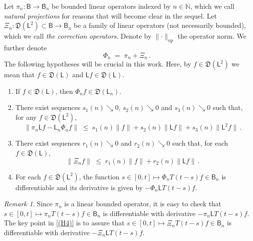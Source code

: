 \documentclass[12pt,a4paper]{article}
\theoremstyle{plain}
\theoremstyle{remark}
\newtheorem{remark}[theorem]{Remark}
\newcommand{\msf}[1]{{\mathsf #1}}
\newcommand{\mf}[1]{{\mathfrak #1}}
\newcommand{\bb}[1]{{\mathbb #1}}
\newcommand{\norm}[1]{\lVert#1\rVert}
\begin{document}
	Let $\pi_n : \msf{B} \to \msf{B}_n$ be bounded linear operators indexed by $n \in \bb{N}$, which we call \textit{natural projections} for reasons that will become clear in the sequel.
	Let  $\Xi_n : \mf{D}(\msf{L}^2)\subset \msf{B} \to \msf{B}_n$ be a family of linear operators (not necessarily bounded), which we call \textit{the correction operators}. Denote by $\norm{\cdot}_\text{op}$ the operator norm. We further denote
	\begin{equation}\label{eq:A}
		\Phi_n \;=\; \pi_n + \Xi_n\,.
	\end{equation}
	The following hypotheses will be crucial in this work. Here, by $f \in \mf{D}(\msf{L}^2)$ we mean that $f \in \mf{D}(\msf{L})$ and $\msf{L}f \in \mf{D}(\msf{L})$.
	\begin{enumerate}[label=(H\arabic*)]
		\item \label{(H1)} If $f\in \mf{D}(\msf{L})$, then $\Phi_nf\in\mf D(\msf{L_n})$.
		\item \label{(H2)} There exist sequences $s_1(n)\searrow0$, $s_2(n)\searrow0$ and $s_3(n)\searrow 0$ such that, for any $f\in\mf{D}(\msf{L}^2)$,
		\begin{equation*}
			\norm{\pi_n\msf{L}f-\msf{L}_n\Phi_nf}\;\leq\;s_1(n)\norm{f}+s_2(n)\norm{\msf{L}f}+s_3(n)\norm{\msf{L}^{2}f}\,.
		\end{equation*}
		\item \label{(H3)} There exist sequences $r_1(n)\searrow0$ and $r_2(n)\searrow0$ such that, for each $f\in\mf{D}(\msf{L})$,
		\begin{equation*}
			\norm{\Xi_nf}\;\leq\;r_1(n)\norm{f} +r_2(n)\norm{\msf{L}f}\,.
		\end{equation*}
		\item \label{(H4)} For each $f\in \mf{D}(\msf{L}^2)$, the function $s \in [0,t] \mapsto \Phi_n T(t-s)f\in \msf{B}_n$ is differentiable and its derivative is given by $-\Phi_n \msf{L} T(t-s) f$.
	\end{enumerate}
	\begin{remark}\label{rmk21}
		Since $\pi_n$ is a linear bounded operator, it is easy to check that   $s \in [0,t] \mapsto \pi_n T(t-s)f\in \msf{B}_n$ is differentiable with derivative  $-\pi_n \msf{L}T(t-s) f$. The key point in \ref{(H4)} is to assure that    $s \in [0,t] \mapsto \Xi_n T(t-s)f\in \msf{B}_n$ is differentiable with derivative  $-\Xi_n \msf{L} T(t-s) f$.
	\end{remark}
	
\end{document}
